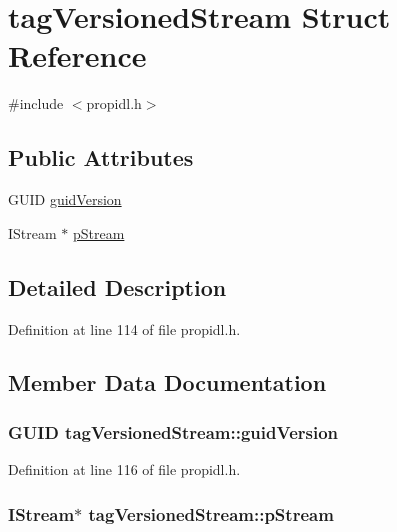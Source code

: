 \hypertarget{structtag_versioned_stream}{}\section{tag\+Versioned\+Stream Struct Reference}
\label{structtag_versioned_stream}


{\ttfamily \#include $<$propidl.\+h$>$}

\subsection*{Public Attributes}
\begin{DoxyCompactItemize}
\item 
G\+U\+ID \hyperlink{structtag_versioned_stream_ab7f718b99c26913d2a3ab837dc413e7c}{guid\+Version}
\item 
I\+Stream $\ast$ \hyperlink{structtag_versioned_stream_a7c354d2316229a42793d7c765a6c1cd3}{p\+Stream}
\end{DoxyCompactItemize}


\subsection{Detailed Description}


Definition at line 114 of file propidl.\+h.



\subsection{Member Data Documentation}
\subsubsection[{\texorpdfstring{guid\+Version}{guidVersion}}]{\setlength{\rightskip}{0pt plus 5cm}G\+U\+ID tag\+Versioned\+Stream\+::guid\+Version}\hypertarget{structtag_versioned_stream_ab7f718b99c26913d2a3ab837dc413e7c}{}\label{structtag_versioned_stream_ab7f718b99c26913d2a3ab837dc413e7c}


Definition at line 116 of file propidl.\+h.

\subsubsection[{\texorpdfstring{p\+Stream}{pStream}}]{\setlength{\rightskip}{0pt plus 5cm}I\+Stream$\ast$ tag\+Versioned\+Stream\+::p\+Stream}\hypertarget{structtag_versioned_stream_a7c354d2316229a42793d7c765a6c1cd3}{}\label{structtag_versioned_stream_a7c354d2316229a42793d7c765a6c1cd3}


